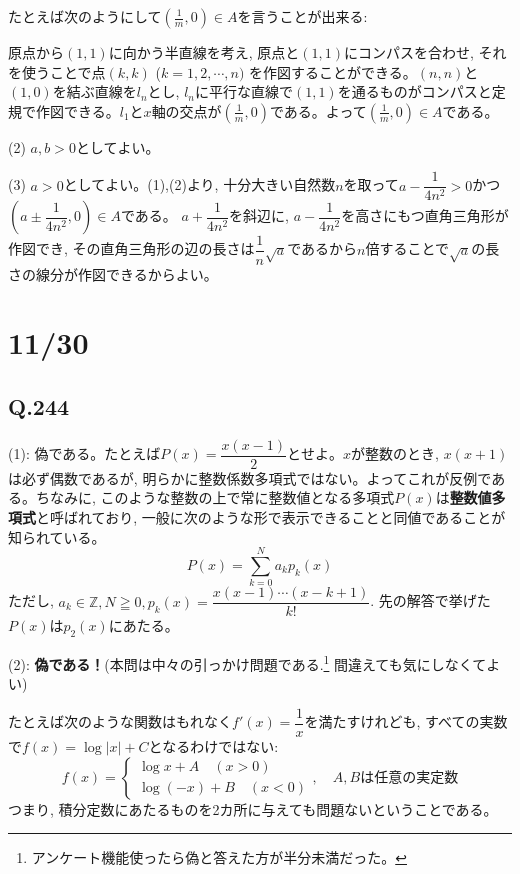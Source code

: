 \documentclass[twocolumn]{jbook}
\theoremstyle{definition}
\newcommand{\bcas}{\begin{cases}}
\newcommand{\ecas}{\end{cases}}
\newcommand{\mb}{\mathbb}
\renewcommand{\geq}{\geqq}
\begin{document}
たとえば次のようにして$(\frac{1}{m},0)\in A$を言うことが出来る:

原点から$(1,1)$に向かう半直線を考え, 原点と$(1,1)$にコンパスを合わせ, それを使うことで点$(k,k)$ ($k=1,2,\cdots, n)$ を作図することができる。$(n,n)$と$(1,0)$を結ぶ直線を$l_n$とし, $l_n$に平行な直線で$(1,1)$を通るものがコンパスと定規で作図できる。$l_1$と$x$軸の交点が$(\frac{1}{m}, 0)$である。よって$(\frac{1}{m},0)\in A$である。

(2) $a,b>0$としてよい。

(3) $a>0$としてよい。(1),(2)より, 十分大きい自然数$n$を取って$a-\dfrac{1}{4n^2} > 0$かつ$(a\pm \dfrac{1}{4n^2}, 0)\in A$である。
$a+\dfrac{1}{4n^2}$を斜辺に, $a-\dfrac{1}{4n^2}$を高さにもつ直角三角形が作図でき, その直角三角形の辺の長さは$\dfrac{1}{n}\sqrt{a}$であるから$n$倍することで$\sqrt{a}$の長さの線分が作図できるからよい。



\clearpage

\section{11/30}
\subsection{Q.244}

(1): 偽である。たとえば$P(x) = \dfrac{x(x-1)}{2}$とせよ。$x$が整数のとき, $x(x+1)$は必ず偶数であるが, 明らかに整数係数多項式ではない。よってこれが反例である。ちなみに, このような整数の上で常に整数値となる多項式$P(x)$は\textbf{整数値多項式}と呼ばれており, 一般に次のような形で表示できることと同値であることが知られている。
\[
P(x) = \sum_{k=0}^{N} a_kp_{k}(x)
\]
ただし, $a_k\in\mb{Z}, N\geq 0,  p_{k}(x) = \dfrac{x(x-1)\cdots (x-k+1)}{k!}$.  先の解答で挙げた$P(x)$は$p_2(x)$にあたる。

(2): \textbf{偽である！}(本問は中々の引っかけ問題である.\footnote{アンケート機能使ったら偽と答えた方が半分未満だった。} 間違えても気にしなくてよい)

たとえば次のような関数はもれなく$f'(x)=\dfrac{1}{x}$を満たすけれども, すべての実数で$f(x) = \log{|x|}+C$となるわけではない:
\[
f(x) = \bcas
\log{x} + A\quad (x>0)\\
\log{(-x)} + B\quad (x<0) 
\ecas
,\quad A,B\text{は任意の実定数}
\]
つまり, 積分定数にあたるものを2カ所に与えても問題ないということである。
\end{document}
